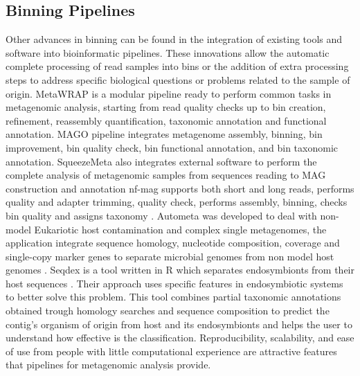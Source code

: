 \documentclass{article}
\begin{document}
\subsection{Binning Pipelines}
Other advances in binning can be found in the integration of existing tools and software into bioinformatic pipelines.
These innovations allow the automatic complete processing of read samples into bins or the addition of extra processing steps to address specific biological questions or problems related to the sample of origin.
MetaWRAP is a modular pipeline ready to perform common tasks in metagenomic analysis, starting from read quality checks up to bin creation, refinement, reassembly quantification, taxonomic annotation and functional annotation.
MAGO pipeline integrates metagenome assembly, binning, bin improvement, bin quality check, bin functional annotation, and bin taxonomic annotation. 
SqueezeMeta also integrates external software to perform the complete analysis of metagenomic samples from sequences reading to MAG construction and annotation \cite{tamames2019squeezemeta}
nf-mag supports both short and long reads, performs quality and adapter trimming, quality check,  performs assembly, binning, checks bin quality and assigns taxonomy \cite{ewels2020nf}.
Autometa was developed to deal with non-model Eukariotic host contamination and complex single metagenomes, the application integrate sequence homology, nucleotide composition, coverage and single-copy marker genes to separate microbial genomes from non model host genomes \cite{miller2019autometa}. 
Seqdex is a tool written in R which separates endosymbionts from their host sequences \cite{chiodi2019seqdechi}.
Their approach uses specific features in endosymbiotic systems to better solve this problem.
This tool combines partial taxonomic annotations obtained trough homology searches and sequence composition to predict the contig's organism of origin from host and its endosymbionts and helps the user to understand how effective is the classification.
Reproducibility, scalability, and ease of use from people with little computational experience are attractive features that pipelines for metagenomic analysis provide.
\end{document}
